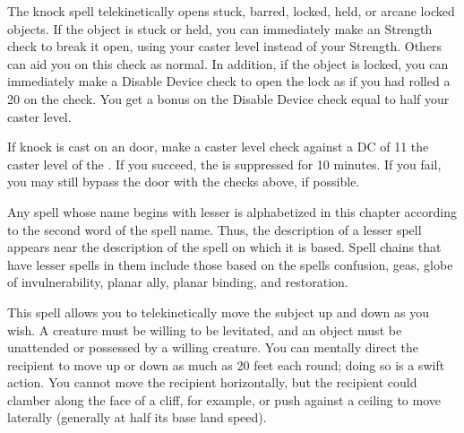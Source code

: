 \begin{comment}
\subsubsection{J-L}
\end{comment}

\spellrng{\rngclose}
\begin{spelleffect}
  The knock spell telekinetically opens stuck, barred, locked, held, or arcane locked objects. If the object is stuck or held, you can immediately make an Strength check to break it open, using your caster level instead of your Strength. Others can aid you on this check as normal. In addition, if the object is locked, you can immediately make a Disable Device check to open the lock as if you had rolled a 20 on the check. You get a bonus on the Disable Device check equal to half your caster level.
\end{spelleffect}
\begin{spellnotes}
  If knock is cast on an  door, make a caster level check against a DC of 11 \add the caster level of the . If you succeed, the  is suppressed for 10 minutes. If you fail, you may still bypass the door with the checks above, if possible.
\end{spellnotes}

\par Any spell whose name begins with lesser is alphabetized in this chapter according to the second word of the spell name. Thus, the description of a lesser spell appears near the description of the spell on which it is based. Spell chains that have lesser spells in them include those based on the spells confusion, geas, globe of invulnerability, planar ally, planar binding, and restoration.

\spellrng{\rngclose}
\begin{spelleffect}
  This spell allows you to telekinetically move the subject up and down as you wish. A creature must be willing to be levitated, and an object must be unattended or possessed by a willing creature. You can mentally direct the recipient to move up or down as much as 20 feet each round; doing so is a swift action. You cannot move the recipient horizontally, but the recipient could clamber along the face of a cliff, for example, or push against a ceiling to move laterally (generally at half its base land speed).
\end{spelleffect}

